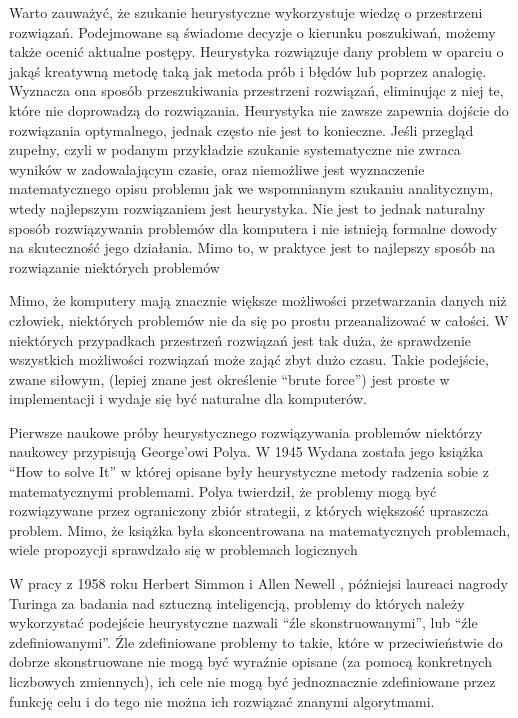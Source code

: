 \documentclass[twoside]{iisthesis}
\begin{document}
Warto zauważyć, że szukanie heurystyczne wykorzystuje wiedzę o przestrzeni rozwiązań. Podejmowane są świadome decyzje o kierunku poszukiwań, możemy także ocenić aktualne postępy. Heurystyka rozwiązuje dany problem w oparciu o jakąś kreatywną metodę taką jak metoda prób i błędów lub poprzez analogię. Wyznacza ona sposób przeszukiwania przestrzeni rozwiązań, eliminując z niej te, które nie doprowadzą do rozwiązania. Heurystyka nie zawsze zapewnia dojście do rozwiązania optymalnego, jednak często nie jest to konieczne. Jeśli przegląd zupełny, czyli w podanym przykładzie szukanie systematyczne nie zwraca wyników w zadowalającym czasie, oraz niemożliwe jest wyznaczenie matematycznego opisu problemu jak we wspomnianym szukaniu analitycznym, wtedy najlepszym rozwiązaniem jest heurystyka. Nie jest to jednak naturalny sposób rozwiązywania problemów dla komputera i nie istnieją formalne dowody na skuteczność jego działania. Mimo to, w praktyce jest to najlepszy sposób na rozwiązanie niektórych problemów

Mimo, że komputery mają znacznie większe możliwości przetwarzania danych niż człowiek, niektórych problemów nie da się po prostu przeanalizować w całości. W niektórych przypadkach przestrzeń rozwiązań jest tak duża, że sprawdzenie wszystkich możliwości rozwiązań może zająć zbyt dużo czasu. Takie podejście, zwane siłowym, (lepiej znane jest określenie ``brute force'') jest proste w implementacji i wydaje się być naturalne dla komputerów.

Pierwsze naukowe próby heurystycznego rozwiązywania problemów niektórzy naukowcy \cite{history-meta} przypisują George'owi Polya. W 1945 Wydana została jego książka ``How to solve It'' \cite{polya} w której opisane były heurystyczne metody radzenia sobie z matematycznymi problemami. Polya twierdził, że problemy mogą być rozwiązywane przez ograniczony zbiór strategii, z których większość upraszcza problem. Mimo, że książka była skoncentrowana na matematycznych problemach, wiele propozycji sprawdzało się w problemach logicznych

W pracy z 1958 roku Herbert Simmon i Allen Newell \cite{simon1958heuristic}, późniejsi laureaci nagrody Turinga za badania nad sztuczną inteligencją, problemy do których należy wykorzystać podejście heurystyczne nazwali ``źle skonstruowanymi'', lub ``źle zdefiniowanymi''. Źle zdefiniowane problemy to takie, które w przeciwieństwie do dobrze skonstruowane nie mogą być wyraźnie opisane (za pomocą konkretnych liczbowych zmiennych), ich cele nie mogą być jednoznacznie zdefiniowane przez funkcję celu i do tego nie można ich rozwiązać znanymi algorytmami. 
\end{document}
